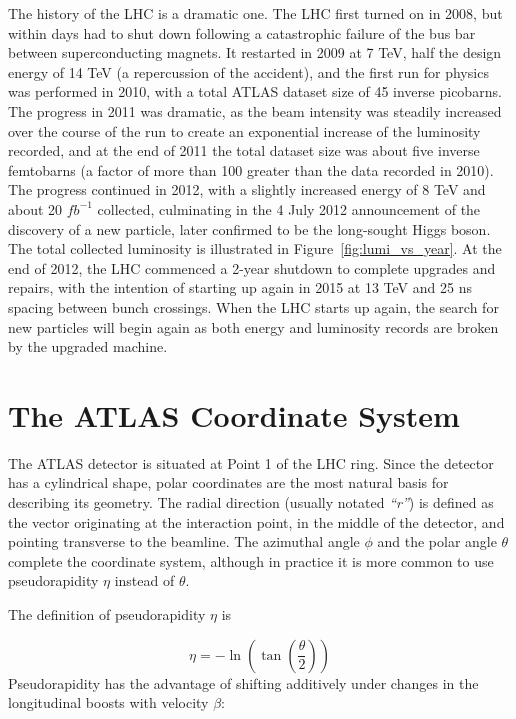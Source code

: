 The history of the LHC is a dramatic one.  The LHC first turned on in 2008, but within 
days had to shut down following a catastrophic failure of the bus bar between superconducting magnets.  It restarted in 
2009 at 7 TeV, half the design energy of 14 TeV (a repercussion of the accident), and 
the first run for physics was performed in 2010, with a total ATLAS dataset size of 45 inverse picobarns.  
The progress in 2011 was dramatic, as the beam intensity was steadily increased over the course of the run 
to create an exponential increase of the luminosity recorded, and at the end of 2011 the total dataset size 
was about five inverse femtobarns (a factor of more than 100 greater than the data recorded in 2010).  
The progress continued in 2012, with a slightly increased energy of 8 TeV and about 20 $fb^{-1}$ 
collected, culminating in the 4 July 2012 announcement of the discovery of a new particle, later confirmed to 
be the long-sought Higgs boson.  The total collected luminosity is illustrated in Figure~\ref{fig:lumi_vs_year}.  
At the end of 2012, the LHC commenced a 2-year shutdown to complete upgrades and repairs, 
with the intention of starting up again in 2015 at 13 TeV and 25 ns spacing between bunch crossings.
When the LHC starts up again, the search for new particles will begin again as both energy and luminosity
records are broken by the upgraded machine.



\section{The ATLAS Coordinate System}
The ATLAS detector is situated at Point 1 of the LHC ring.  Since the detector has a cylindrical shape, 
polar coordinates are the most natural basis for describing its geometry.  The radial direction (usually notated \textit{``r''}) 
is defined as the vector originating at the interaction point, in the middle of the detector, and pointing 
transverse to the beamline.  The azimuthal angle $\phi$ and the polar angle $\theta$ complete the 
coordinate system, although in practice it is more common to use pseudorapidity $\eta$ instead of $\theta$.  
  
The definition of pseudorapidity $\eta$ is

\begin{equation}
\eta = -\ln(\tan( \frac{\theta}{2} ))
\end{equation}
Pseudorapidity has the advantage of shifting additively under changes in the longitudinal boosts with velocity
$\beta$:


